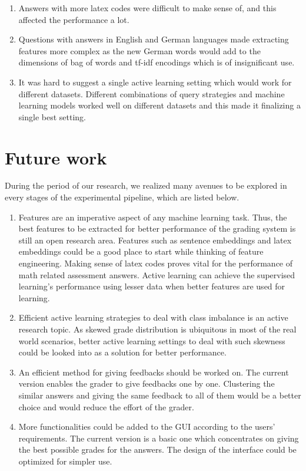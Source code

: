     \begin{enumerate}
    	\item Answers with more latex codes were difficult to make sense of, and this affected the performance a lot.
    	
    	\item Questions with answers in English and German languages made extracting features more complex as the new German words would add to the dimensions of bag of words and tf-idf encodings which is of insignificant use. 
    	
    	\item It was hard to suggest a single active learning setting which would work for different datasets. Different combinations of query strategies and machine learning models worked well on different datasets and this made it finalizing a single best setting.
    \end{enumerate}

    \section{Future work}
    
    During the period of our research, we realized many avenues to be explored in every stages of the experimental pipeline, which are listed below.
    
    \begin{enumerate}
    	\item Features are an imperative aspect of any machine learning task. Thus, the best features to be extracted for better performance of the grading system is still an open research area. Features such as sentence embeddings and latex embeddings could be a good place to start while thinking of feature engineering. Making sense of latex codes proves vital for the performance of math related assessment answers. Active learning can achieve the supervised learning's performance using lesser data when better features are used for learning. 
    	
    	\item Efficient active learning strategies to deal with class imbalance is an active research topic. As skewed grade distribution is ubiquitous in most of the real world scenarios, better active learning settings to deal with such skewness could be looked into as a solution for better performance.
    	
    	\item An efficient method for giving feedbacks should be worked on. The current version enables the grader to give feedbacks one by one. Clustering the similar answers and giving the same feedback to all of them would be a better choice and would reduce the effort of the grader.
    	
    	\item More functionalities could be added to the GUI according to the users' requirements. The current version is a basic one which concentrates on giving the best possible grades for the answers. The design of the interface could be optimized for simpler use.
    \end{enumerate}
    
    

